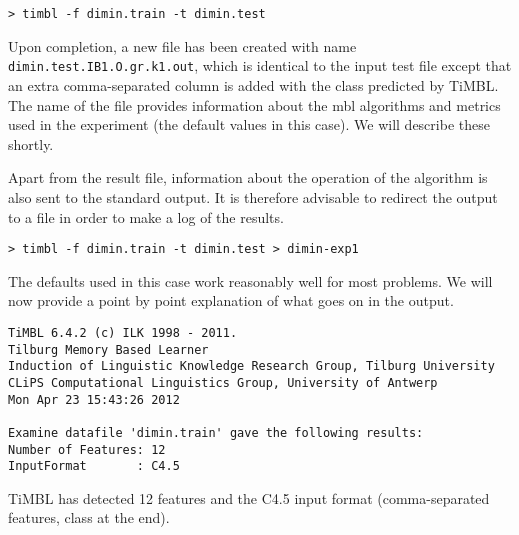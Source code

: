 \documentclass{book}
\begin{document}
{\footnotesize
\begin{verbatim}
> timbl -f dimin.train -t dimin.test
\end{verbatim}
}

Upon completion, a new file has been created with name {\small\tt
dimin.test.IB1.O.gr.k1.out}, which is identical to the
input test file except that an extra comma-separated column is added
with the class predicted by TiMBL. The name of the file provides
information about the {\sc mbl} algorithms and metrics used in the
experiment (the default values in this case). We will describe these
shortly.

Apart from the result file, information about the operation of the
algorithm is also sent to the standard output. It is therefore 
advisable to redirect the output to a file in order to make a log of
the results.

{\footnotesize
\begin{verbatim}
> timbl -f dimin.train -t dimin.test > dimin-exp1
\end{verbatim}
}

The defaults used in this case work reasonably well for most problems.  We
will now provide a point by point explanation of what goes on in the
output.



{\footnotesize
\begin{verbatim}
TiMBL 6.4.2 (c) ILK 1998 - 2011.
Tilburg Memory Based Learner
Induction of Linguistic Knowledge Research Group, Tilburg University
CLiPS Computational Linguistics Group, University of Antwerp
Mon Apr 23 15:43:26 2012

Examine datafile 'dimin.train' gave the following results:
Number of Features: 12
InputFormat       : C4.5
\end{verbatim}
}



TiMBL has detected 12 features and the C4.5 input format
(comma-separated features, class at the end).

\end{document}
